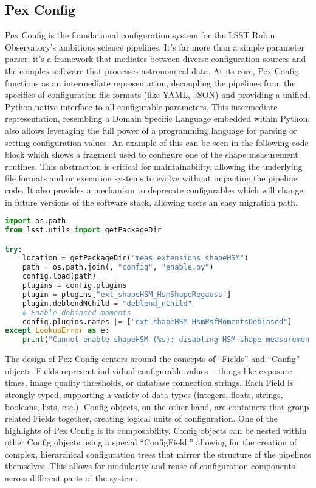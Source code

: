 \subsection{Pex Config}

Pex Config is the foundational configuration system for the LSST Rubin Observatory’s ambitious science pipelines.
It’s far more than a simple parameter parser; it’s a framework that mediates between diverse configuration sources and the complex software that processes astronomical data.
At its core, Pex Config functions as an intermediate representation, decoupling the pipelines from the specifics of configuration file formats (like YAML, JSON) and providing a unified, Python-native interface to all configurable parameters.
This intermediate representation, resembling a Domain Specific Language embedded within Python, also allows leveraging the full power of a programming language for parsing or setting configuration values.
An example of this can be seen in the following code block which shows a fragment used to configure one of the shape measurement routines.
This abstraction is critical for maintainability, allowing the underlying file formats and or execution systems to evolve without impacting the pipeline code.
It also provides a mechanism to deprecate configurables which will change in future versions of the software stack, allowing users an easy migration path.

\begin{minipage}{\columnwidth}
    \begin{lstlisting}[caption=Code configuration in python, language=python]
import os.path
from lsst.utils import getPackageDir

try:
    location = getPackageDir("meas_extensions_shapeHSM")
    path = os.path.join(, "config", "enable.py")
    config.load(path)
    plugins = config.plugins
    plugin = plugins["ext_shapeHSM_HsmShapeRegauss"]
    plugin.deblendNChild = "deblend_nChild"
    # Enable debiased moments
    config.plugins.names |= ["ext_shapeHSM_HsmPsfMomentsDebiased"]
except LookupError as e:
    print("Cannot enable shapeHSM (%s): disabling HSM shape measurements" % (e,))
    \end{lstlisting}
\end{minipage}



The design of Pex Config centers around the concepts of “Fields” and “Config” objects.
Fields represent individual configurable values – things like exposure times, image quality thresholds, or database connection strings.
Each Field is strongly typed, supporting a variety of data types (integers, floats, strings, booleans, lists, etc.).
Config objects, on the other hand, are containers that group related Fields together, creating logical units of configuration.
One of the highlights of Pex Config is its composability.
Config objects can be nested within other Config objects using a special “ConfigField,” allowing for the creation of complex, hierarchical configuration trees that mirror the structure of the pipelines themselves.
This allows for modularity and reuse of configuration components across different parts of the system.


